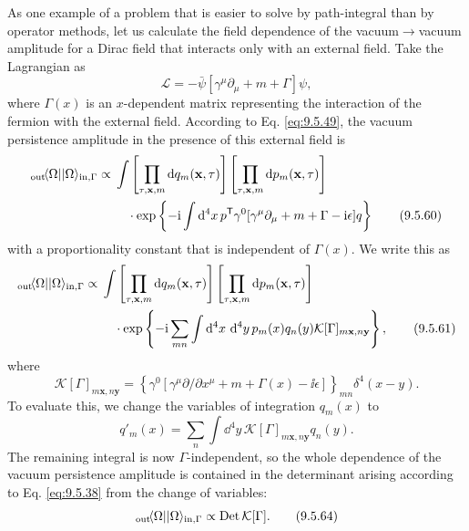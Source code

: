 As one example of a problem that is easier to solve by path-integral than by
operator methods, let us calculate the field dependence of the vacuum$\to$vacuum
amplitude for a Dirac field that interacts only with an external field. Take
the Lagrangian as
\begin{equation}
\mathcal{L}=-\bar\psi[\gamma^\mu\partial_\mu+m+\Gamma]\psi,
\tag{9.5.59}\label{eq:9.5.59}
\end{equation}
where $\Gamma(x)$ is an $x$-dependent matrix representing the interaction of
the fermion with the external field. According to Eq. \eqref{eq:9.5.49}, the vacuum
persistence amplitude in the presence of this external field is
\begin{align}
{}_{\mathrm{out}}\!\langle \Omega\rvert\lvert \Omega\rangle_{\mathrm{in},\Gamma}
\propto{}&\int
 \left[\prod_{\tau,\mathbf{x},m}\mathop{}\!\mathrm{d} q_m(\mathbf{x},\tau)\right]
 \left[\prod_{\tau,\mathbf{x},m}\mathop{}\!\mathrm{d} p_m(\mathbf{x},\tau)\right]
\notag\\
&\quad\cdot\exp\left\{-\mathrm{i}\int \mathop{}\!\mathrm{d}^4x\,
 p^{\mathsf T}\gamma^0[\gamma^\mu\partial_\mu+m+\Gamma-\mathrm{i}\epsilon]q\right\}
\tag{9.5.60}\label{eq:9.5.60}
\end{align}
with a proportionality constant that is independent of $\Gamma(x)$. We write
this as
\begin{align}
{}_{\mathrm{out}}\!\langle \Omega\rvert\lvert \Omega\rangle_{\mathrm{in},\Gamma}
\propto{}&\int
 \left[\prod_{\tau,\mathbf{x},m}\mathop{}\!\mathrm{d} q_m(\mathbf{x},\tau)\right]
 \left[\prod_{\tau,\mathbf{x},m}\mathop{}\!\mathrm{d} p_m(\mathbf{x},\tau)\right]
\notag\\
&\quad\cdot\exp\left\{-\mathrm{i}\sum_{mn}\int \mathop{}\!\mathrm{d}^4x\,\mathop{}\!\mathrm{d}^4y\,
 p_m(x)q_n(y)\mathcal{K}[\Gamma]_{m\mathbf{x},n\mathbf{y}}\right\},
\tag{9.5.61}\label{eq:9.5.61}
\end{align}
where
\begin{equation}
\mathcal{K}[\Gamma]_{m\mathbf{x},n\mathbf{y}}
=\left\{\gamma^0[\gamma^\mu\partial/\partial x^\mu
 +m+\Gamma(x)-\ii\epsilon]\right\}_{mn}\delta^4(x-y).
\tag{9.5.62}\label{eq:9.5.62}
\end{equation}
To evaluate this, we change the variables of integration $q_m(x)$ to
\begin{equation}
q'_m(x)=\sum_n\int \dd^4y\,
 \mathcal{K}[\Gamma]_{m\mathbf{x},n\mathbf{y}}q_n(y).
\tag{9.5.63}\label{eq:9.5.63}
\end{equation}
The remaining integral is now $\Gamma$-independent, so the whole dependence of
the vacuum persistence amplitude is contained in the determinant arising
according to Eq. \eqref{eq:9.5.38} from the change of variables:
\begin{equation}
{}_{\mathrm{out}}\!\langle \Omega\rvert\lvert \Omega\rangle_{\mathrm{in},\Gamma}
\propto\operatorname{Det}\mathcal{K}[\Gamma].
\tag{9.5.64}\label{eq:9.5.64}
\end{equation}
